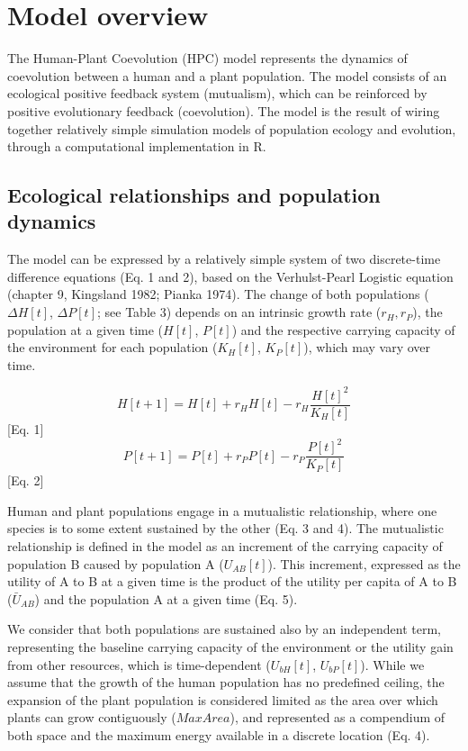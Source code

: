 \documentclass[
]{book}
\begin{document}
\hypertarget{model-overview}{%
\chapter*{Model overview}\label{model-overview}}

The Human-Plant Coevolution (HPC) model represents the dynamics of coevolution between a human and a plant population. The model consists of an ecological positive feedback system (mutualism), which can be reinforced by positive evolutionary feedback (coevolution). The model is the result of wiring together relatively simple simulation models of population ecology and evolution, through a computational implementation in R.

\newpage

\hypertarget{ecological-relationships-and-population-dynamics}{%
\section*{Ecological relationships and population dynamics}\label{ecological-relationships-and-population-dynamics}}

The model can be expressed by a relatively simple system of two discrete-time difference equations (Eq. 1 and 2), based on the Verhulst-Pearl Logistic equation (chapter 9, Kingsland 1982; Pianka 1974). The change of both populations (\(\Delta H[t]\), \(\Delta P[t]\); see Table 3) depends on an intrinsic growth rate (\(r_{H}, r_{P}\)), the population at a given time (\(H[t]\), \(P[t]\)) and the respective carrying capacity of the environment for each population (\(K_{H}[t]\), \(K_{P}[t]\)), which may vary over time.

\[H[t+1]=H[t]+r_{H}H[t]-r_{H}\frac{H[t]^{2}}{K_{H}[t]}\] {[}Eq. 1{]}
\[P[t+1]=P[t]+r_{P}P[t]-r_{P}\frac{P[t]^{2}}{K_{P}[t]}\] {[}Eq. 2{]}

Human and plant populations engage in a mutualistic relationship, where one species is to some extent sustained by the other (Eq. 3 and 4). The mutualistic relationship is defined in the model as an increment of the carrying capacity of population B caused by population A (\(U_{AB}[t]\)). This increment, expressed as the utility of A to B at a given time is the product of the utility per capita of A to B (\(\bar{U}_{AB}\)) and the population A at a given time (Eq. 5).

We consider that both populations are sustained also by an independent term, representing the baseline carrying capacity of the environment or the utility gain from other resources, which is time-dependent (\(U_{bH}[t]\), \(U_{bP}[t]\)). While we assume that the growth of the human population has no predefined ceiling, the expansion of the plant population is considered limited as the area over which plants can grow contiguously (\(MaxArea\)), and represented as a compendium of both space and the maximum energy available in a discrete location (Eq. 4).
\end{document}
